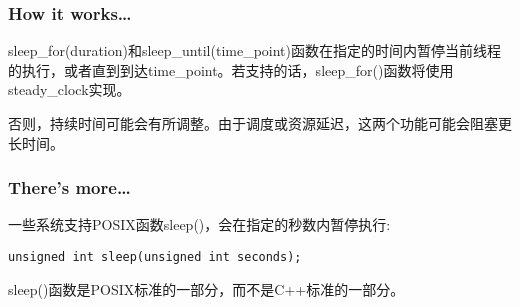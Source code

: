 \subsubsection{How it works…}

sleep\_for(duration)和sleep\_until(time\_point)函数在指定的时间内暂停当前线程的执行，或者直到到达time\_point。若支持的话，sleep\_for()函数将使用steady\_clock实现。

否则，持续时间可能会有所调整。由于调度或资源延迟，这两个功能可能会阻塞更长时间。

\subsubsection{There's more…}

一些系统支持POSIX函数sleep()，会在指定的秒数内暂停执行:

\begin{lstlisting}[style=styleCXX]
unsigned int sleep(unsigned int seconds);
\end{lstlisting}

sleep()函数是POSIX标准的一部分，而不是C++标准的一部分。







